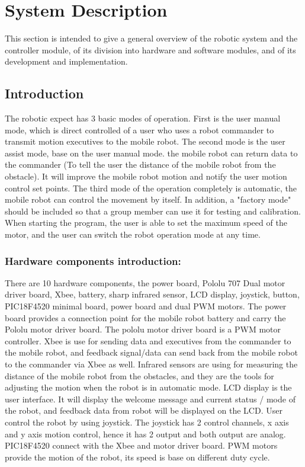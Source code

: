 \documentclass[MTRX3700report.tex]{subfiles}
\begin{document}
\section{System Description}
This section is intended to give a general overview of the robotic system and the controller module, of its division into hardware and software modules, and of its development and implementation.
\subsection{Introduction}
The robotic expect has 3 basic modes of operation. First is the user manual mode, which is direct controlled of a user who uses a robot commander to transmit motion executives to the mobile robot. The second mode is the user assist mode, base on the user manual mode. the mobile robot can return data to the commander (To tell the user the distance of the mobile robot from the obstacle). It will improve the mobile robot motion and notify the user motion control set points. The third mode of the operation completely is automatic, the mobile robot can control the movement by itself. In addition, a "factory mode" should be included so that a group member can use it for testing and calibration. When starting the program, the user is able to set the maximum speed of the motor, and the user can switch the robot operation mode at any time.
\subsubsection{Hardware components introduction:}
There are 10 hardware components, the power board, Pololu 707 Dual motor driver board, Xbee, battery, sharp infrared sensor, LCD display, joystick, button, PIC18F4520 minimal board, power board and dual PWM motors. The power board provides a connection point for the mobile robot battery and carry the Pololu motor driver board. The pololu motor driver board is a PWM motor controller. Xbee is use for sending data and executives from the commander to the mobile robot, and feedback signal/data can send back from the mobile robot to the commander via Xbee as well. Infrared sensors are using for measuring the distance of the mobile robot from the obstacles, and they are the tools for adjusting the motion when the robot is in automatic mode. LCD display is the user interface. It will display the welcome message and current status / mode of the robot, and feedback data from robot will be displayed on the LCD. User control the robot by using joystick. The joystick has 2 control channels, x axis and y axis motion control, hence it has 2 output and both output are analog. PIC18F4520 connect with the Xbee and motor driver board.
PWM motors provide the motion of the robot, its speed is base on different duty cycle.
\end{document}
